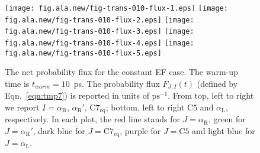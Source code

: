 \documentclass[a4paper,preprint,unsortedaddress,onecolumn]{revtex4-1}
\newcommand{\confaa}[0]{{\alpha_{\textrm{R}}}}
\newcommand{\confab}[0]{{\alpha_{\textrm{R}}'}}
\newcommand{\confba}[0]{{\textrm{C}7_{\textrm{eq}}}}
\newcommand{\confbb}[0]{{\textrm{C}5}}
\newcommand{\confc}[0]{{\alpha_{\textrm{L}}}}
\begin{document}
\begin{figure}
  \centering
  \texttt{[image: fig.ala.new/fig-trans-010-flux-1.eps]}
  \texttt{[image: fig.ala.new/fig-trans-010-flux-2.eps]}
  \texttt{[image: fig.ala.new/fig-trans-010-flux-3.eps]}
  \texttt{[image: fig.ala.new/fig-trans-010-flux-4.eps]}
  \texttt{[image: fig.ala.new/fig-trans-010-flux-5.eps]}
  \caption{
    The net probability flux for the constant EF case.
    The warm-up time is $t_{warm} = 10$~ps.
    The probability flux $F_{J,I}(t)$ (defined by Eqn.~\eqref{eqn:tmp7}) is reported in units of $\textrm{ps}^{-1}$.
    From top, left to right we report $I = \confaa$, $\confab$, $\confba$; bottom, left to right $\confbb$ and
    $\confc$, respectively. In each plot, the red line stands for $J=\confaa$,
    green for $J=\confab$, dark blue for $J=\confba$, purple for $J=\confbb$ and light blue
    for $J=\confc$.
    }
  \label{fig:tmp6}
\end{figure}
\end{document}
